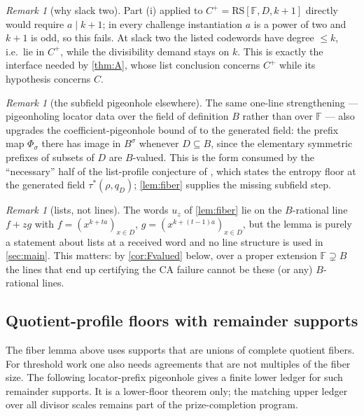 \documentclass[11pt]{article}
\theoremstyle{definition}
\theoremstyle{remark}
\newtheorem{remark}[theorem]{Remark}
\newcommand{\F}{\mathbb{F}}
\newcommand{\B}{B}
\newcommand{\RS}{\mathrm{RS}}
\begin{document}
\begin{remark}[why slack two]\label{rem:slacktwo}
Part (i) applied to $C^+=\RS[\F,D,k+1]$ directly would require $a\mid k+1$; in every challenge instantiation $a$ is a power of two and $k+1$ is odd, so this fails. At slack two the listed codewords have degree $\le k$, i.e.\ lie in $C^+$, while the divisibility demand stays on $k$. This is exactly the interface needed by \cref{thm:A}, whose list conclusion concerns $C^+$ while its hypothesis concerns $C$.
\end{remark}

\begin{remark}[the subfield pigeonhole elsewhere]\label{rem:subpigeon}
The same one-line strengthening --- pigeonholing locator data over the field of definition $\B$ rather than over $\F$ --- also upgrades the coefficient-pigeonhole bound of \cite{Cho26b} to the generated field: the prefix map $\Phi_\sigma$ there has image in $\B^\sigma$ whenever $D\subseteq\B$, since the elementary symmetric prefixes of subsets of $D$ are $\B$-valued. This is the form consumed by the ``necessary'' half of the list-profile conjecture of \cite{Cho26b}, which states the entropy floor at the generated field $\tau^{*}(\rho,q_D)$; \cref{lem:fiber} supplies the missing subfield step.
\end{remark}

\begin{remark}[lists, not lines]\label{rem:lines}
The words $u_z$ of \cref{lem:fiber} lie on the $\B$-rational line $f+zg$ with $f=(x^{k+ta})_{x\in D}$, $g=(x^{k+(t-1)a})_{x\in D}$, but the lemma is purely a statement about lists at a received word and no line structure is used in \cref{sec:main}. This matters: by \cref{cor:Fvalued} below, over a proper extension $\F\supsetneq\B$ the lines that end up certifying the CA failure cannot be these (or any) $\B$-rational lines.
\end{remark}

\subsection{Quotient-profile floors with remainder supports}
\label{sec:quotient-remainder}

The fiber lemma above uses supports that are unions of complete quotient fibers.
For threshold work one also needs agreements that are not multiples of the fiber
size.  The following locator-prefix pigeonhole gives a finite lower ledger for
such remainder supports.  It is a lower-floor theorem only; the matching upper
ledger over all divisor scales remains part of the prize-completion program.
\end{document}
